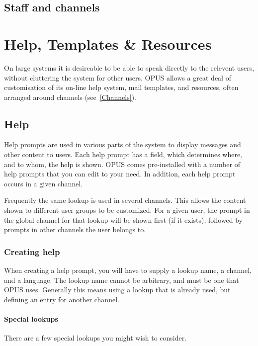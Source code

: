 \documentclass[12 pt]{book}
\begin{document}
\section{Staff and channels}

%
%
%

\chapter{Help, Templates \& Resources}

On large systems it is desireable to be able to speak directly to the
relevent users, without cluttering the system for other users. OPUS
allows a great deal of customisation of its on-line help system, mail
templates, and resources, often arranged around channels (see~\ref{Channels}).

\section{Help}
\label{Help}

Help prompts are used in various parts of the system to display messages
and other content to users. Each help prompt has a  field,
which determines where, and to whom, the help is shown. OPUS comes
pre-installed with a number of help prompts that you can edit to your
need. In addition, each help prompt occurs in a given channel.

Frequently the same lookup is used in several channels. This allows the
content shown to different user groups to be customized. For a given
user, the prompt in the global channel for that lookup will be shown first
(if it exists), followed by prompts in other channels the user belongs to.

\subsection{Creating help}

When creating a help prompt, you will have to supply a lookup name, a
channel, and a language. The lookup name cannot be arbitrary, and must
be one that OPUS uses. Generally this means using a lookup that is
already used, but defining an entry for another channel.

\subsubsection{Special lookups}

There are a few special lookups you might wish to consider.
\end{document}
